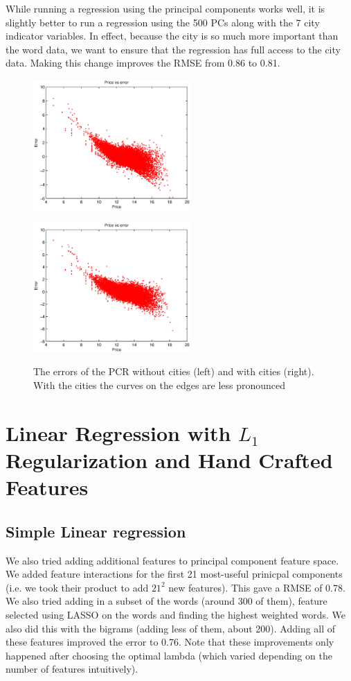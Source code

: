 \documentclass[a4paper,10pt]{article}
\begin{document}
While running a regression using the principal components works well, it is slightly better to run a regression using the 500 PCs along with the 7 city indicator variables. In effect, because the city is so much more important than the word data, we want to ensure that the regression has full access to the city data. Making this change improves the RMSE from 0.86 to 0.81.

\begin{figure}[H]
 \centering
 \begin{minipage}{.5\textwidth}
    \centering
    \includegraphics[width=6.0cm]{PCRPriceVsError.eps}
    \label{fig:fig1}
  \end{minipage}%
  \begin{minipage}{.5\textwidth}
    \centering
    \includegraphics[width=6.0cm]{PCRPriceVsErrorWithCities.eps}
    \label{fig:fig2}
  \end{minipage}
 \caption{The errors of the PCR without cities (left) and with cities (right).
	  With the cities the curves on the edges are less pronounced}
\end{figure}

\section{Linear Regression with $L_1$ Regularization and Hand Crafted Features}
\subsection*{Simple Linear regression}
We also tried adding additional features to principal component feature space. We added feature interactions for the first 21 most-useful prinicpal components (i.e. we took their product to add $21^2$ new features). This gave a RMSE of 0.78. We also tried adding in a subset of the words (around 300 of them), feature selected using LASSO on the words and finding the highest weighted words. We also did this with the bigrams (adding less of them, about 200). Adding all of these features improved the error to 0.76. Note that these improvements only happened after choosing the optimal lambda (which varied depending on the number of features intuitively). 
\end{document}
